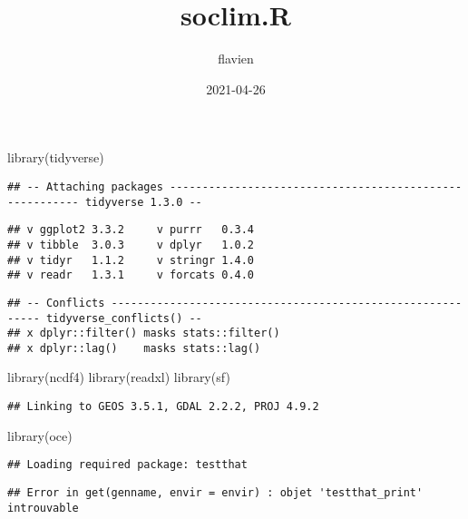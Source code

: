\documentclass[
]{article}
\title{soclim.R}
\author{flavien}
\date{2021-04-26}
\newenvironment{Shaded}{\begin{snugshade}}{\end{snugshade}}
\newcommand{\FunctionTok}[1]{\textcolor[rgb]{0.00,0.00,0.00}{#1}}
\newcommand{\NormalTok}[1]{#1}
\begin{document}
\maketitle

\begin{Shaded}
\begin{Highlighting}[]
\FunctionTok{library}\NormalTok{(tidyverse)}
\end{Highlighting}
\end{Shaded}

\begin{verbatim}
## -- Attaching packages -------------------------------------------------------- tidyverse 1.3.0 --
\end{verbatim}

\begin{verbatim}
## v ggplot2 3.3.2     v purrr   0.3.4
## v tibble  3.0.3     v dplyr   1.0.2
## v tidyr   1.1.2     v stringr 1.4.0
## v readr   1.3.1     v forcats 0.4.0
\end{verbatim}

\begin{verbatim}
## -- Conflicts ----------------------------------------------------------- tidyverse_conflicts() --
## x dplyr::filter() masks stats::filter()
## x dplyr::lag()    masks stats::lag()
\end{verbatim}

\begin{Shaded}
\begin{Highlighting}[]
\FunctionTok{library}\NormalTok{(ncdf4)}
\FunctionTok{library}\NormalTok{(readxl)}
\FunctionTok{library}\NormalTok{(sf)}
\end{Highlighting}
\end{Shaded}

\begin{verbatim}
## Linking to GEOS 3.5.1, GDAL 2.2.2, PROJ 4.9.2
\end{verbatim}

\begin{Shaded}
\begin{Highlighting}[]
\FunctionTok{library}\NormalTok{(oce)}
\end{Highlighting}
\end{Shaded}

\begin{verbatim}
## Loading required package: testthat
\end{verbatim}

\begin{verbatim}
## Error in get(genname, envir = envir) : objet 'testthat_print' introuvable
\end{verbatim}
\end{document}
